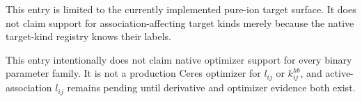 \documentclass[12pt, letterpaper]{article}
\begin{document}
This entry is limited to the currently implemented pure-ion target surface. It
does not claim support for association-affecting target kinds merely because the
native target-kind registry knows their labels.


This entry intentionally does not claim native optimizer support for every
binary parameter family. It is not a production Ceres optimizer for \(l_{ij}\)
or \(k^{hb}_{ij}\), and active-association \(l_{ij}\) remains pending until
derivative and optimizer evidence both exist.
\end{document}
